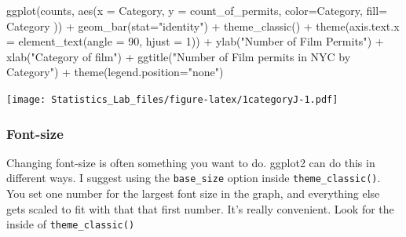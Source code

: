 \documentclass[
]{book}
\newenvironment{Shaded}{\begin{snugshade}}{\end{snugshade}}
\newcommand{\AttributeTok}[1]{\textcolor[rgb]{0.77,0.63,0.00}{#1}}
\newcommand{\DecValTok}[1]{\textcolor[rgb]{0.00,0.00,0.81}{#1}}
\newcommand{\FunctionTok}[1]{\textcolor[rgb]{0.00,0.00,0.00}{#1}}
\newcommand{\NormalTok}[1]{#1}
\newcommand{\SpecialCharTok}[1]{\textcolor[rgb]{0.00,0.00,0.00}{#1}}
\newcommand{\StringTok}[1]{\textcolor[rgb]{0.31,0.60,0.02}{#1}}
\begin{document}
\begin{Shaded}
\begin{Highlighting}[]
\FunctionTok{ggplot}\NormalTok{(counts, }\FunctionTok{aes}\NormalTok{(}\AttributeTok{x =}\NormalTok{ Category, }\AttributeTok{y =}\NormalTok{ count\_of\_permits, }
                   \AttributeTok{color=}\NormalTok{Category, }
                   \AttributeTok{fill=}\NormalTok{ Category )) }\SpecialCharTok{+}
  \FunctionTok{geom\_bar}\NormalTok{(}\AttributeTok{stat=}\StringTok{"identity"}\NormalTok{) }\SpecialCharTok{+} 
  \FunctionTok{theme\_classic}\NormalTok{() }\SpecialCharTok{+}
  \FunctionTok{theme}\NormalTok{(}\AttributeTok{axis.text.x =} \FunctionTok{element\_text}\NormalTok{(}\AttributeTok{angle =} \DecValTok{90}\NormalTok{, }\AttributeTok{hjust =} \DecValTok{1}\NormalTok{)) }\SpecialCharTok{+}
  \FunctionTok{ylab}\NormalTok{(}\StringTok{"Number of Film Permits"}\NormalTok{) }\SpecialCharTok{+} 
  \FunctionTok{xlab}\NormalTok{(}\StringTok{"Category of film"}\NormalTok{) }\SpecialCharTok{+}
  \FunctionTok{ggtitle}\NormalTok{(}\StringTok{"Number of Film permits in NYC by Category"}\NormalTok{) }\SpecialCharTok{+}
  \FunctionTok{theme}\NormalTok{(}\AttributeTok{legend.position=}\StringTok{"none"}\NormalTok{) }
\end{Highlighting}
\end{Shaded}

\texttt{[image: Statistics\_Lab\_files/figure-latex/1categoryJ-1.pdf]}

\hypertarget{font-size}{%
\subsubsection{Font-size}\label{font-size}}

Changing font-size is often something you want to do. ggplot2 can do this in different ways. I suggest using the \texttt{base\_size} option inside \texttt{theme\_classic()}. You set one number for the largest font size in the graph, and everything else gets scaled to fit with that that first number. It's really convenient. Look for the inside of \texttt{theme\_classic()}
\end{document}
